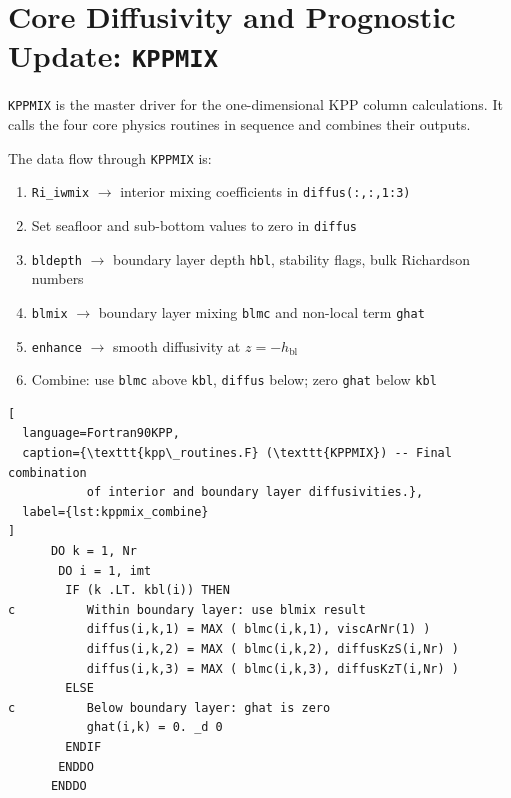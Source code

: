\documentclass[12pt,letterpaper]{article}
\newcommand{\hbl}{h_{\mathrm{bl}}}
\begin{document}
\section{Core Diffusivity and Prognostic Update: \texttt{KPPMIX}}  
\label{sec:core_diffusivity}  
  
\texttt{KPPMIX} is the master driver for the one-dimensional KPP column  
calculations. It calls the four core physics routines in sequence and  
combines their outputs.  
  
The data flow through \texttt{KPPMIX} is:  
  
\begin{enumerate}[leftmargin=*, label=\textbf{\arabic*.}]  
  \item \texttt{Ri\_iwmix} $\rightarrow$ interior mixing coefficients  
        in \texttt{diffus(:,:,1:3)}  
  \item Set seafloor and sub-bottom values to zero in \texttt{diffus}  
  \item \texttt{bldepth} $\rightarrow$ boundary layer depth \texttt{hbl},  
        stability flags, bulk Richardson numbers  
  \item \texttt{blmix} $\rightarrow$ boundary layer mixing \texttt{blmc}  
        and non-local term \texttt{ghat}  
  \item \texttt{enhance} $\rightarrow$ smooth diffusivity at $z = -\hbl$  
  \item Combine: use \texttt{blmc} above \texttt{kbl}, \texttt{diffus}  
        below; zero \texttt{ghat} below \texttt{kbl}  
\end{enumerate}  
  
\begin{lstlisting}[  
  language=Fortran90KPP,  
  caption={\texttt{kpp\_routines.F} (\texttt{KPPMIX}) -- Final combination  
           of interior and boundary layer diffusivities.},  
  label={lst:kppmix_combine}  
]  
      DO k = 1, Nr  
       DO i = 1, imt  
        IF (k .LT. kbl(i)) THEN  
c          Within boundary layer: use blmix result  
           diffus(i,k,1) = MAX ( blmc(i,k,1), viscArNr(1) )  
           diffus(i,k,2) = MAX ( blmc(i,k,2), diffusKzS(i,Nr) )  
           diffus(i,k,3) = MAX ( blmc(i,k,3), diffusKzT(i,Nr) )  
        ELSE  
c          Below boundary layer: ghat is zero  
           ghat(i,k) = 0. _d 0  
        ENDIF  
       ENDDO  
      ENDDO  
\end{lstlisting}  
  
\end{document}
